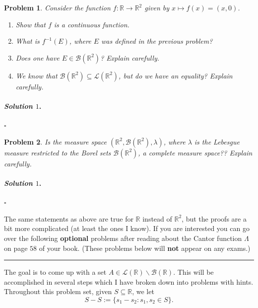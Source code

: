 \documentclass[reqno]{amsart}
\theoremstyle{plain}
\newtheorem{problem}{Problem}
\theoremstyle{definition}
\newenvironment{solution1}{\paragraph{\emph{Solution $1$}.}}{\hfill$\square$}
\begin{document}
\begin{problem}
Consider the function $f: \mathbb{R} \rightarrow \mathbb{R}^{2}$ given by $x \mapsto f(x) = (x,0)$.  
\begin{enumerate}
\item Show that $f$ is a continuous function.
\item What is $f^{-1}(E)$, where $E$ was defined in the previous problem?
\item Does one have $E \in \mathcal{B}(\mathbb{R}^{2})$?  Explain carefully.
\item We know that $\mathcal{B}(\mathbb{R}^{2}) \subseteq \mathcal{L}(\mathbb{R}^{2})$, but do we have an equality?  Explain carefully.
\end{enumerate}
\end{problem}
\begin{solution1}

\end{solution1}


\begin{problem}
Is the measure space $(\mathbb{R}^{2},\mathcal{B}(\mathbb{R}^{2}),\lambda)$, where $\lambda$ is the Lebesgue measure restricted to the Borel sets $\mathcal{B}(\mathbb{R}^{2})$, a complete measure space??  Explain carefully.
\end{problem}
\begin{solution1}

\end{solution1}


The same statements as above are true for $\mathbb{R}$ instead of $\mathbb{R}^{2}$, but the proofs are a bit more complicated (at least the ones I know).  If you are interested you can go over the following {\bfseries optional} problems after reading about the Cantor function $\Lambda$ on page $58$ of your book.  (These problems below will {\bfseries not} appear on any exams.)

\noindent\rule{\linewidth}{0.4pt}

The goal is to come up with a set $A \in \mathcal{L}(\mathbb{R}) \smallsetminus \mathcal{B}(\mathbb{R})$.  This will be accomplished in several steps which I have broken down into problems with hints.  Throughout this problem set, given $S \subseteq \mathbb{R}$, we let 
$$S - S :=\{s_{1} - s_{2} : s_{1}, s_{2} \in S \}. $$
\end{document}
